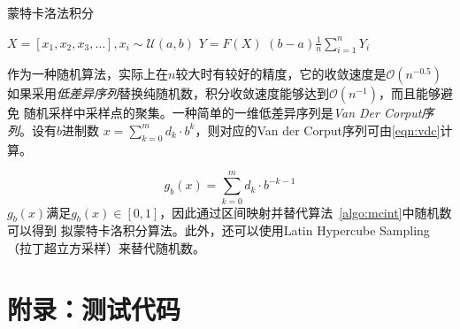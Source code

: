 \documentclass[a4paper,twoside]{article}
\begin{document}
\begin{spacing}{1.2}
\begin{algorithm}
	\caption{蒙特卡洛法积分}
	\label{algo:mcint}
	\begin{algorithmic}[1]
		
		\State $X=[x_1,x_2,x_3,\ldots], x_i \sim\mathcal{U}(a,b)$
		\State $Y=F(X)$
		\State \Return $(b-a)\frac{1}{n}\sum_{i=1}^nY_i$
		\EndProcedure
	\end{algorithmic}
\end{algorithm}	

作为一种随机算法，实际上在$n$较大时有较好的精度，它的收敛速度是$\mathcal{O}(n^{-0.5})$
如果采用\emph{低差异序列}替换纯随机数，积分收敛速度能够达到$\mathcal{O}(n^{-1})$，而且能够避免
随机采样中采样点的聚集。一种简单的一维低差异序列是\emph{Van Der Corput序列}。设有$b$进制数
$x=\sum_{k=0}^md_k\cdot b^k$，则对应的Van der Corput序列可由\eqref{eqn:vdc}计算。

\begin{equation}
	\label{eqn:vdc}
	g_b(x)=\sum_{k=0}^{m}d_k\cdot b^{-k-1}
\end{equation}
$g_b(x)$满足$g_b(x)\in [0,1]$，因此通过区间映射并替代算法~\ref{algo:mcint}中随机数可以得到
拟蒙特卡洛积分算法。此外，还可以使用Latin Hypercube Sampling（拉丁超立方采样）来替代随机数。

\clearpage

\section{附录：测试代码}
\label{sec:app_code}
\end{spacing}
\end{document}
